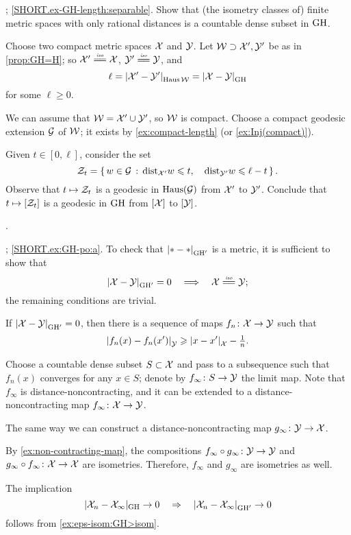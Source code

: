 \parbf{\ref{ex-GH-length}}; \ref{SHORT.ex-GH-length:separable}. Show that (the isometry classes of) finite metric spaces with only rational distances is a countable dense subset in $\operatorname{\rm GH}\nolimits$. 

Choose two compact metric spaces $\mathcal{X}$ and $\mathcal{Y}$.
Let $\mathcal{W}\supset \mathcal{X}',\mathcal{Y}'$ be as in \ref{prop:GH=H};
so $\spc{X}'\iso \spc{X}$, $\spc{Y}'\iso \spc{Y}$, and
\[\ell=\dist{\spc{X}'}{\spc{Y}'}{\Haus\spc{W}}=\dist{\spc{X}}{\spc{Y}}{\GH}\]
for some $\ell\ge 0$.

We can assume that $\mathcal{W}=\mathcal{X}'\cup\mathcal{Y}'$, so $\mathcal{W}$ is compact.
Choose a compact geodesic extension $\mathcal{G}$ of $\mathcal{W}$;
it exists by \ref{ex:compact-length} (or \ref{ex:Inj(compact)}).

Given $t\in[0,\ell]$, consider the set
\[\mathcal{Z}_t=\left\{\,{w\in \mathcal{G}}\,:\,{\mathrm{dist}_{\mathcal{X}'}w\leqslant t,\quad \mathrm{dist}_{\mathcal{Y}'}w\leqslant \ell-t}\,\right\}.\]
Observe that $t\mapsto \mathcal{Z}_t$ is a geodesic in $\operatorname{\rm Haus}\nolimits(\mathcal{G})$ from $\mathcal{X}'$ to $\mathcal{Y}'$.
Conclude that $t\mapsto [\mathcal{Z}_t]$ is a geodesic in $\operatorname{\rm GH}\nolimits$ from $[\mathcal{X}]$ to $[\mathcal{Y}]$.

 \cite{ivanov-nikolaeva-tuzhilin}.

\parbf{\ref{ex:GH-po}}; \ref{SHORT.ex:GH-po:a}.
To check that $\dist{*}{*}{\GH'}$ is a metric, it is sufficient to show that
\[\dist{\spc{X}}{\spc{Y}}{\GH'}=0 
\quad\Longrightarrow\quad
\spc{X}\iso\spc{Y};\]
the remaining conditions are trivial.

If $\dist{\spc{X}}{\spc{Y}}{\GH'}=0$, then there is a sequence of maps $f_n\colon\mathcal{X}\to \mathcal{Y}$ such that 
\[\dist{f_n(x)}{f_n(x')}{\spc{Y}}\ge \dist{x}{x'}{\spc{X}}-\tfrac1n.\]

Choose a countable dense subset $S\subset \mathcal{X}$ and pass to a subsequence such that $f_n(x)$ converges for any $x\in S$; denote by $f_\infty\colon S\to \mathcal{Y}$ the limit map.
Note that $f_\infty$ is distance-noncontracting, and it can be extended to a distance-noncontracting map $f_\infty\colon\mathcal{X}\to \mathcal{Y}$.

The same way we can construct a distance-noncontracting map 
$g_\infty\colon\mathcal{Y}\to \mathcal{X}$.

By \ref{ex:non-contracting-map}, the compositions $f_\infty\circ g_\infty\colon\mathcal{Y}\to \mathcal{Y}$ and $g_\infty\z\circ f_\infty\:\spc{X}\to \spc{X}$ are isometries.
Therefore, $f_\infty$ and $g_\infty$ are isometries as well.

 The implication 
\[|\spc{X}_n-\spc{X}_\infty|_{\GH}\to 0 
\quad\Rightarrow\quad 
\dist{\spc{X}_n}{\spc{X}_\infty}{\GH'}\to 0\]
follows from \ref{ex:eps-isom:GH>isom}. 

